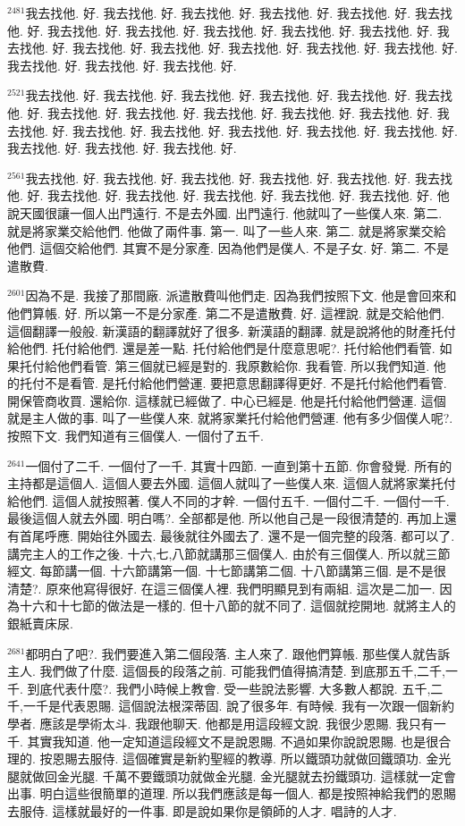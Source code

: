 \documentclass{book}
\begin{document}
$^{2481}$我去找他.
好.
我去找他.
好.
我去找他.
好.
我去找他.
好.
我去找他.
好.
我去找他.
好.
我去找他.
好.
我去找他.
好.
我去找他.
好.
我去找他.
好.
我去找他.
好.
我去找他.
好.
我去找他.
好.
我去找他.
好.
我去找他.
好.
我去找他.
好.
我去找他.
好.
我去找他.
好.
我去找他.
好.
我去找他.
好.

$^{2521}$我去找他.
好.
我去找他.
好.
我去找他.
好.
我去找他.
好.
我去找他.
好.
我去找他.
好.
我去找他.
好.
我去找他.
好.
我去找他.
好.
我去找他.
好.
我去找他.
好.
我去找他.
好.
我去找他.
好.
我去找他.
好.
我去找他.
好.
我去找他.
好.
我去找他.
好.
我去找他.
好.
我去找他.
好.
我去找他.
好.

$^{2561}$我去找他.
好.
我去找他.
好.
我去找他.
好.
我去找他.
好.
我去找他.
好.
我去找他.
好.
我去找他.
好.
我去找他.
好.
我去找他.
好.
我去找他.
好.
我去找他.
好.
他說天國很讓一個人出門遠行.
不是去外國.
出門遠行.
他就叫了一些僕人來.
第二.
就是將家業交給他們.
他做了兩件事.
第一.
叫了一些人來.
第二.
就是將家業交給他們.
這個交給他們.
其實不是分家產.
因為他們是僕人.
不是子女.
好.
第二.
不是遣散費.

$^{2601}$因為不是.
我接了那間廠.
派遣散費叫他們走.
因為我們按照下文.
他是會回來和他們算帳.
好.
所以第一不是分家產.
第二不是遣散費.
好.
這裡說.
就是交給他們.
這個翻譯一般般.
新漢語的翻譯就好了很多.
新漢語的翻譯.
就是說將他的財產托付給他們.
托付給他們.
還是差一點.
托付給他們是什麼意思呢?.
托付給他們看管.
如果托付給他們看管.
第三個就已經是對的.
我原數給你.
我看管.
所以我們知道.
他的托付不是看管.
是托付給他們營運.
要把意思翻譯得更好.
不是托付給他們看管.
開保管商收買.
還給你.
這樣就已經做了.
中心已經是.
他是托付給他們營運.
這個就是主人做的事.
叫了一些僕人來.
就將家業托付給他們營運.
他有多少個僕人呢?.
按照下文.
我們知道有三個僕人.
一個付了五千.

$^{2641}$一個付了二千.
一個付了一千.
其實十四節.
一直到第十五節.
你會發覺.
所有的主持都是這個人.
這個人要去外國.
這個人就叫了一些僕人來.
這個人就將家業托付給他們.
這個人就按照著.
僕人不同的才幹.
一個付五千.
一個付二千.
一個付一千.
最後這個人就去外國.
明白嗎?.
全部都是他.
所以他自己是一段很清楚的.
再加上還有首尾呼應.
開始往外國去.
最後就往外國去了.
還不是一個完整的段落.
都可以了.
講完主人的工作之後.
十六,七,八節就講那三個僕人.
由於有三個僕人.
所以就三節經文.
每節講一個.
十六節講第一個.
十七節講第二個.
十八節講第三個.
是不是很清楚?.
原來他寫得很好.
在這三個僕人裡.
我們明顯見到有兩組.
這次是二加一.
因為十六和十七節的做法是一樣的.
但十八節的就不同了.
這個就挖開地.
就將主人的銀紙賣床尿.

$^{2681}$都明白了吧?.
我們要進入第二個段落.
主人來了.
跟他們算帳.
那些僕人就告訴主人.
我們做了什麼.
這個長的段落之前.
可能我們值得搞清楚.
到底那五千,二千,一千.
到底代表什麼?.
我們小時候上教會.
受一些說法影響.
大多數人都說.
五千,二千,一千是代表恩賜.
這個說法根深蒂固.
說了很多年.
有時候.
我有一次跟一個新約學者.
應該是學術太斗.
我跟他聊天.
他都是用這段經文說.
我很少恩賜.
我只有一千.
其實我知道.
他一定知道這段經文不是說恩賜.
不過如果你說說恩賜.
也是很合理的.
按恩賜去服侍.
這個確實是新約聖經的教導.
所以鐵頭功就做回鐵頭功.
金光腿就做回金光腿.
千萬不要鐵頭功就做金光腿.
金光腿就去扮鐵頭功.
這樣就一定會出事.
明白這些很簡單的道理.
所以我們應該是每一個人.
都是按照神給我們的恩賜去服侍.
這樣就最好的一件事.
即是說如果你是領師的人才.
唱詩的人才.
\end{document}
